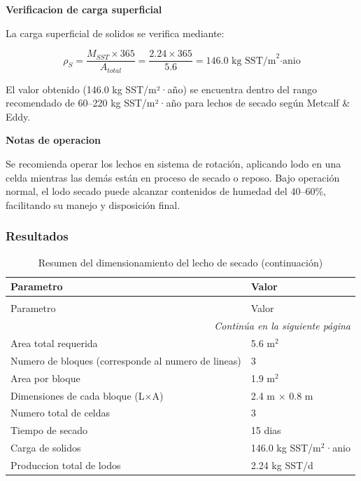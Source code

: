 \documentclass[12pt,a4paper]{article}
\begin{document}
\textbf{Verificacion de carga superficial}

La carga superficial de solidos se verifica mediante:

\begin{equation}
\rho_S = \frac{M_{SST} \times 365}{A_{total}} = \frac{2.24 \times 365}{5.6} = 146.0 \text{ kg SST/m}^2\text{·anio}
\end{equation}

El valor obtenido (146.0 kg SST/m²·año) se encuentra dentro del rango recomendado de 60--220 kg SST/m²·año para lechos de secado según Metcalf & Eddy.

\textbf{Notas de operacion}

Se recomienda operar los lechos en sistema de rotación, aplicando lodo en una celda mientras las demás están en proceso de secado o reposo. Bajo operación normal, el lodo secado puede alcanzar contenidos de humedad del 40--60\%, facilitando su manejo y disposición final.

\subsubsection{Resultados}

\begingroup
\small
\begin{longtable}{ll}
\caption{Resumen del dimensionamiento del lecho de secado}\\
\toprule
Parametro & Valor \\
\midrule
\endfirsthead
\caption[]{Resumen del dimensionamiento del lecho de secado (continuación)}\\
\toprule
Parametro & Valor \\
\midrule
\endhead
\midrule
\multicolumn{2}{r}{\textit{Continúa en la siguiente página}} \\
\endfoot
\bottomrule
\endlastfoot
Area total requerida & 5.6 m$^2$ \\
Numero de bloques (corresponde al numero de lineas) & 3 \\
Area por bloque & 1.9 m$^2$ \\
Dimensiones de cada bloque (L$\times$A) & 2.4 m $\times$ 0.8 m \\
Numero total de celdas & 3 \\
Tiempo de secado & 15 dias \\
Carga de solidos & 146.0 kg SST/m$^2$·anio \\
Produccion total de lodos & 2.24 kg SST/d \\
\end{longtable}
\endgroup
\end{document}

